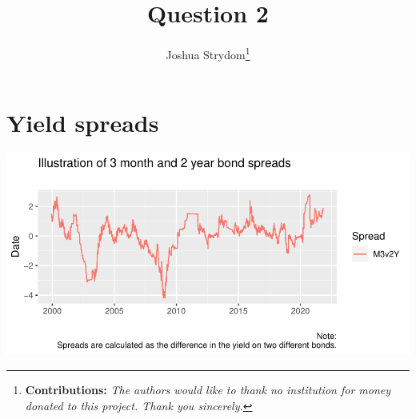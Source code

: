 \documentclass[11pt,preprint, authoryear]{elsarticle}
\let\origfigure\figure
\let\endorigfigure\endfigure
\renewenvironment{figure}[1][2] {
    \expandafter\origfigure\expandafter[H]
} {
    \endorigfigure
}
\numberwithin{equation}{section}
\numberwithin{figure}{section}
\numberwithin{table}{section}
\let\rmarkdownfootnote\footnote%
\def\footnote{\protect\rmarkdownfootnote}
\begin{document}
\begin{frontmatter}  %

\title{Question 2}





\author[Add1]{Joshua Strydom\footnote{\textbf{Contributions:}
  \newline \emph{The authors would like to thank no institution for
  money donated to this project. Thank you sincerely.}}}





\address[Add1]{Stellenbosch University, Stellenbosch, South Africa}



\vspace{1cm}





\vspace{0.5cm}

\end{frontmatter}



\pagestyle{fancy}
\chead{}
\rhead{}
\lfoot{}
\lhead{}
\cfoot{}


\headsep 35pt %




\hypertarget{yield-spreads}{%
\section{\texorpdfstring{Yield spreads
\label{Yield}}{Yield spreads }}\label{yield-spreads}}

\begin{figure}[H]

{\centering \includegraphics{Question2_files/figure-latex/Figure1-1} 

}

\caption{Caption Here \label{Figure1}}\label{fig:Figure1}
\end{figure}
\end{document}
